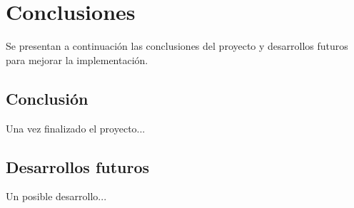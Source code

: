 \chapter{Conclusiones}

Se presentan a continuación las conclusiones del proyecto y desarrollos futuros para mejorar la implementación.

\section{Conclusión}

Una vez finalizado el proyecto...

\section{Desarrollos futuros}

Un posible desarrollo...